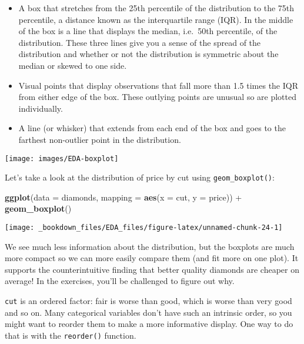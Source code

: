 \documentclass[]{book}
\newenvironment{Shaded}{\begin{snugshade}}{\end{snugshade}}
\newcommand{\KeywordTok}[1]{\textcolor[rgb]{0.13,0.29,0.53}{\textbf{{#1}}}}
\newcommand{\DataTypeTok}[1]{\textcolor[rgb]{0.13,0.29,0.53}{{#1}}}
\newcommand{\StringTok}[1]{\textcolor[rgb]{0.31,0.60,0.02}{{#1}}}
\newcommand{\NormalTok}[1]{{#1}}
\begin{document}
\begin{itemize}
\item
  A box that stretches from the 25th percentile of the distribution to
  the 75th percentile, a distance known as the interquartile range
  (IQR). In the middle of the box is a line that displays the median,
  i.e.~50th percentile, of the distribution. These three lines give you
  a sense of the spread of the distribution and whether or not the
  distribution is symmetric about the median or skewed to one side.
\item
  Visual points that display observations that fall more than 1.5 times
  the IQR from either edge of the box. These outlying points are unusual
  so are plotted individually.
\item
  A line (or whisker) that extends from each end of the box and goes to
  the\\
  farthest non-outlier point in the distribution.
\end{itemize}

\begin{center}\texttt{[image: images/EDA-boxplot]} \end{center}

Let's take a look at the distribution of price by cut using
\texttt{geom\_boxplot()}:

\begin{Shaded}
\begin{Highlighting}[]
\KeywordTok{ggplot}\NormalTok{(}\DataTypeTok{data =} \NormalTok{diamonds, }\DataTypeTok{mapping =} \KeywordTok{aes}\NormalTok{(}\DataTypeTok{x =} \NormalTok{cut, }\DataTypeTok{y =} \NormalTok{price)) +}
\StringTok{  }\KeywordTok{geom_boxplot}\NormalTok{()}
\end{Highlighting}
\end{Shaded}

\begin{center}\texttt{[image: \_bookdown\_files/EDA\_files/figure-latex/unnamed-chunk-24-1]} \end{center}

We see much less information about the distribution, but the boxplots
are much more compact so we can more easily compare them (and fit more
on one plot). It supports the counterintuitive finding that better
quality diamonds are cheaper on average! In the exercises, you'll be
challenged to figure out why.

\texttt{cut} is an ordered factor: fair is worse than good, which is
worse than very good and so on. Many categorical variables don't have
such an intrinsic order, so you might want to reorder them to make a
more informative display. One way to do that is with the
\texttt{reorder()} function.
\end{document}
